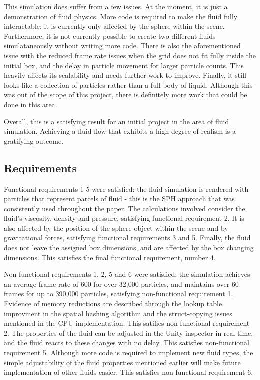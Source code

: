 \documentclass[12pt]{article}
\begin{document}
    This simulation does suffer from a few issues. At the moment, it is just a demonstration of fluid physics. More code is required to make the fluid fully interactable; it is currently only affected by the sphere within the scene. Furthermore, it is not currently possible to create two different fluids simulataneously without writing more code. There is also the aforementioned issue with the reduced frame rate issues when the grid does not fit fully inside the initial box, and the delay in particle movement for larger particle counts. This heavily affects its scalability and needs further work to improve. Finally, it still looks like a collection of particles rather than a full body of liquid. Although this was out of the scope of this project, there is definitely more work that could be done in this area.

    Overall, this is a satisfying result for an initial project in the area of fluid simulation. Achieving a fluid flow that exhibits a high degree of realism is a gratifying outcome.

    \subsection{Requirements}

    Functional requirements 1-5 were satisfied: the fluid simulation is rendered with particles that represent parcels of fluid - this is the SPH approach that was consistently used throughout the paper. The calculations involved consider the fluid's viscosity, density and pressure, satisfying functional requirement 2. It is also affected by the position of the sphere object within the scene and by gravitational forces, satisfying functional requirements 3 and 5. Finally, the fluid does not leave the assigned box dimensions, and are affected by the box changing dimensions. This satisfies the final functional requirement, number 4.

    Non-functional requirements 1, 2, 5 and 6 were satisfied: the simulation achieves an average frame rate of 600 for over 32,000 particles, and maintains over 60 frames for up to 390,000 particles, satisfying non-functional requirement 1. Evidence of memory reductions are described through the lookup table improvment in the spatial hashing algorithm and the struct-copying issues mentioned in the CPU implementation. This satifies non-functional requirement 2. The properties of the fluid can be adjusted in the Unity inspector in real time, and the fluid reacts to these changes with no delay. This satisfies non-functional requirement 5. Although more code is required to implement new fluid types, the simple adjustability of the fluid properties mentioned earlier will make future implementation of other fluids easier. This satisfies non-functional requirement 6.
\end{document}
